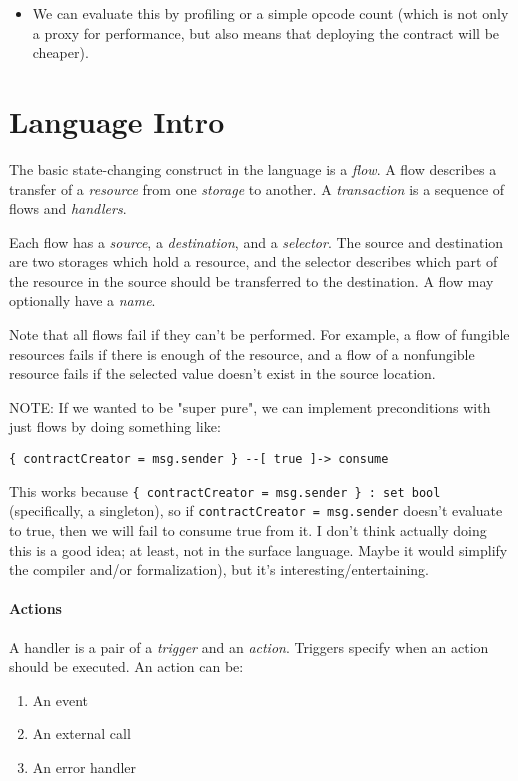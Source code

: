 \documentclass[10pt]{article}
\begin{document}
\begin{itemize}
        \begin{itemize}
            \item We can evaluate this by profiling or a simple opcode count (which is not only a proxy for performance, but also means that deploying the contract will be cheaper).
        \end{itemize}
\end{itemize}


\section{Language Intro}

The basic state-changing construct in the language is a \emph{flow}.
A flow describes a transfer of a \emph{resource} from one \emph{storage} to another.
A \emph{transaction} is a sequence of flows and \emph{handlers}.

Each flow has a \emph{source}, a \emph{destination}, and a \emph{selector}.
The source and destination are two storages which hold a resource, and the selector describes which part of the resource in the source should be transferred to the destination.
A flow may optionally have a \emph{name}.

Note that all flows fail if they can't be performed.
For example, a flow of fungible resources fails if there is enough of the resource, and a flow of a nonfungible resource fails if the selected value doesn't exist in the source location.

NOTE: If we wanted to be "super pure", we can implement preconditions with just flows by doing something like:
\begin{lstlisting}
{ contractCreator = msg.sender } --[ true ]-> consume
\end{lstlisting}
This works because \lstinline|{ contractCreator = msg.sender } : set bool| (specifically, a singleton), so if \lstinline{contractCreator = msg.sender} doesn't evaluate to true, then we will fail to consume true from it.
I don't think actually doing this is a good idea; at least, not in the surface language.
Maybe it would simplify the compiler and/or formalization), but it's interesting/entertaining.

\paragraph{Actions}
A handler is a pair of a \emph{trigger} and an \emph{action}.
Triggers specify when an action should be executed.
An action can be:
\begin{enumerate}
    \item An event
    \item An external call
    \item An error handler
\end{enumerate}
\end{document}
